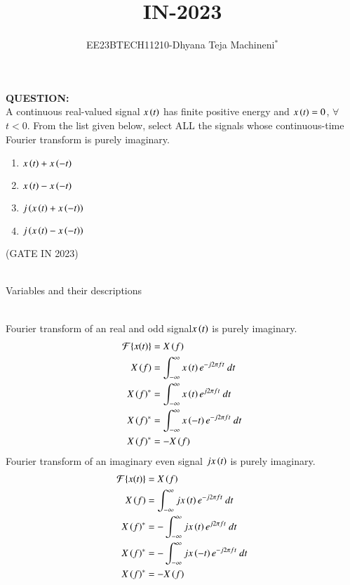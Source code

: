 \documentclass[journal,12pt,twocolumn]{IEEEtran}
\theoremstyle{remark}
\begin{document}

\vspace{3cm}
\title{\textbf{IN-2023}}
\author{EE23BTECH11210-Dhyana Teja Machineni$^{*}$%
}
\maketitle
\newpage
\bigskip

\textbf{QUESTION:}\\
A continuous real-valued signal $x\left(t\right)$ has finite positive energy and $x\left(t\right) = 0$, $\forall$ $t < 0$. From the list given below, select ALL the signals whose
continuous-time Fourier transform is purely imaginary.\\
\begin{enumerate}
\item$x\left(t\right) + x\left(-t\right)$
\item$x\left(t\right) - x\left(-t\right)$
\item$j\left(x\left(t\right) + x\left(-t\right)\right)$
\item$j\left(x\left(t\right) - x\left(-t\right)\right)$
\end{enumerate}
\hfill{(GATE IN 2023)}\\
\solution\\
\begin{table}[h]
         \label{tab:table}
         
         \caption{Variables and their descriptions}
     \end{table}\\
Fourier transform of an real and odd signal$x\left(t\right)$ is purely imaginary.\\
\begin{align}
\mathcal{F}\{x(t)\} &= X\brak{f}\\
X\brak{f}&=\int_{-\infty}^{\infty} x\brak{t} e^{-j 2\pi f t} \ dt\\
X\brak{f}^*&=\int_{-\infty}^{\infty} x\brak{t} e^{j 2\pi f t} \ dt\\
X\brak{f}^*&=\int_{-\infty}^{\infty} x\brak{-t} e^{-j 2\pi f t} \ dt\\
X\brak{f}^*&=-X\brak{f}
\end{align}
 Fourier transform of an imaginary even signal $jx\left(t\right)$ is purely imaginary.\\
\begin{align}
\mathcal{F}\{x(t)\} &= X\brak{f}\\
X\brak{f}&=\int_{-\infty}^{\infty} jx\brak{t} e^{-j 2\pi f t} \ dt\\
X\brak{f}^*&=-\int_{-\infty}^{\infty} jx\brak{t} e^{j 2\pi f t} \ dt\\
X\brak{f}^*&=-\int_{-\infty}^{\infty} jx\brak{-t} e^{-j 2\pi f t} \ dt\\
X\brak{f}^*&=-X\brak{f}
\end{align}
\end{document}
